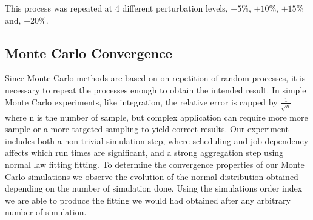 \documentclass[10pt,conference,compsocconf]{IEEEtran}
\newcommand{\pmpc}[1]{$\pm#1\%$}
\begin{document}
This process was repeated at 4 different perturbation levels, \pmpc{5},
\pmpc{10}, \pmpc{15} and, \pmpc{20}.

\subsection{Monte Carlo Convergence}

Since Monte Carlo methods are based on on repetition of random processes, it is
necessary to repeat the processes enough to obtain the intended result. In
simple Monte Carlo experiments, like integration, the relative error is capped
by $\frac{1}{\sqrt{n}}$ where n is the number of sample, but complex application
can require more more sample or a more targeted sampling to yield correct
results. Our experiment includes both a non trivial simulation step, where
scheduling and job dependency affects which run times are significant, and a
strong aggregation step using normal law fitting fitting. To determine the
convergence properties of our Monte Carlo simulations we observe the evolution
of the normal distribution obtained depending on the number of simulation done. 
Using the simulations order index we are able to produce the fitting we would
had obtained after any arbitrary number of simulation.










\end{document}
